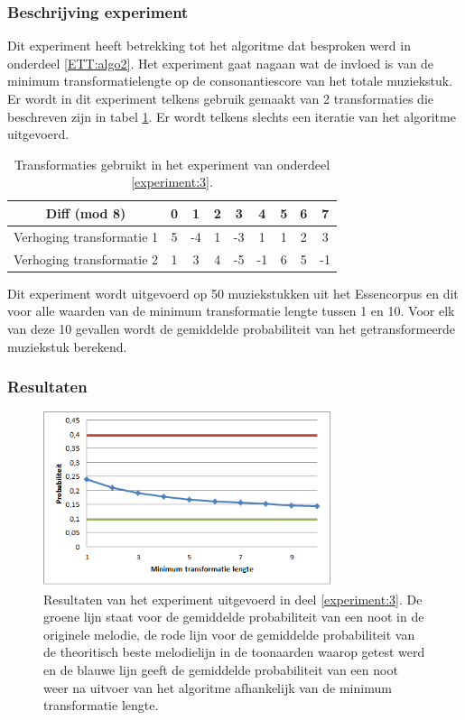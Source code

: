 \subsubsection{Beschrijving experiment}
Dit experiment heeft betrekking tot het algoritme dat besproken werd in onderdeel \ref{ETT:algo2}. Het experiment gaat nagaan wat de invloed is van de minimum transformatielengte op de consonantiescore van het totale muziekstuk. Er wordt in dit experiment telkens gebruik gemaakt van 2 transformaties die beschreven zijn in tabel \ref{tabel:exp3}. Er wordt telkens slechts een iteratie van het algoritme uitgevoerd.\\

\begin{table}
  \centering
  \begin{tabular}{c | c c c c c c c c }
    Diff (mod 8) & 0 & 1 & 2 & 3 & 4 & 5 & 6 & 7 \\
    \hline
    \hline
    Verhoging transformatie 1 & 5 & -4 & 1 & -3 & 1 & 1 & 2 & 3 \\
    \hline
    Verhoging transformatie 2 & 1 & 3 & 4 & -5 & -1 & 6 & 5 & -1 \\
  \end{tabular}
  \caption{Transformaties gebruikt in het experiment van onderdeel \ref{experiment:3}.}
  \label{tabel:exp3}
\end{table}

Dit experiment wordt uitgevoerd op 50 muziekstukken uit het Essencorpus en dit voor alle waarden van de minimum transformatie lengte tussen 1 en 10. Voor elk van deze 10 gevallen wordt de gemiddelde probabiliteit van het getransformeerde muziekstuk berekend.

\subsubsection{Resultaten}
\begin{figure}[!ht]
  \centering
  \includegraphics[width=0.75\textwidth]{5_Experimenten_Resultaten/exp3_res}
  \caption{Resultaten van het experiment uitgevoerd in deel \ref{experiment:3}. De groene lijn staat voor de gemiddelde probabiliteit van een noot in de originele melodie, de rode lijn voor de gemiddelde probabiliteit van de theoritisch beste melodielijn in de toonaarden waarop getest werd en de blauwe lijn geeft de gemiddelde probabiliteit van een noot weer na uitvoer van het algoritme afhankelijk van de minimum transformatie lengte.}
  \label{figuur:exp3}
\end{figure}

